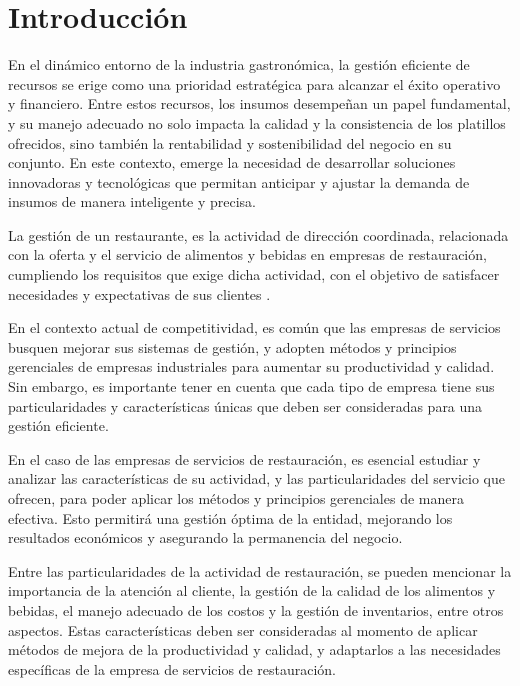 \fancyhead{}
\fancyfoot{}
\cfoot{\thepage}

\chapter{Introducción}

En el dinámico entorno de la industria gastronómica, la gestión eficiente de recursos se erige como una prioridad estratégica para alcanzar el éxito operativo y financiero. Entre estos recursos, los insumos desempeñan un papel fundamental, y su manejo adecuado no solo impacta la calidad y la consistencia de los platillos ofrecidos, sino también la rentabilidad y sostenibilidad del negocio en su conjunto. En este contexto, emerge la necesidad de desarrollar soluciones innovadoras y tecnológicas que permitan anticipar y ajustar la demanda de insumos de manera inteligente y precisa.

La gestión de un restaurante, es la actividad de dirección coordinada, relacionada con la oferta y el servicio de alimentos y bebidas en empresas de restauración, cumpliendo los requisitos que exige dicha actividad, con el objetivo de satisfacer necesidades y expectativas de sus clientes \cite{sampieri}.

En el contexto actual de competitividad, es común que las empresas de servicios busquen mejorar sus sistemas de gestión, y adopten métodos y principios gerenciales de empresas industriales para aumentar su productividad y calidad. Sin embargo, es importante tener en cuenta que cada tipo de empresa tiene sus particularidades y características únicas que deben ser consideradas para una gestión eficiente.

En el caso de las empresas de servicios de restauración, es esencial estudiar y analizar las características de su actividad, y las particularidades del servicio que ofrecen, para poder aplicar los métodos y principios gerenciales de manera efectiva. Esto permitirá una gestión óptima de la entidad, mejorando los resultados económicos y asegurando la permanencia del negocio.

Entre las particularidades de la actividad de restauración, se pueden mencionar la importancia de la atención al cliente, la gestión de la calidad de los alimentos y bebidas, el manejo adecuado de los costos y la gestión de inventarios, entre otros aspectos. Estas características deben ser consideradas al momento de aplicar métodos de mejora de la productividad y calidad, y adaptarlos a las necesidades específicas de la empresa de servicios de restauración.


